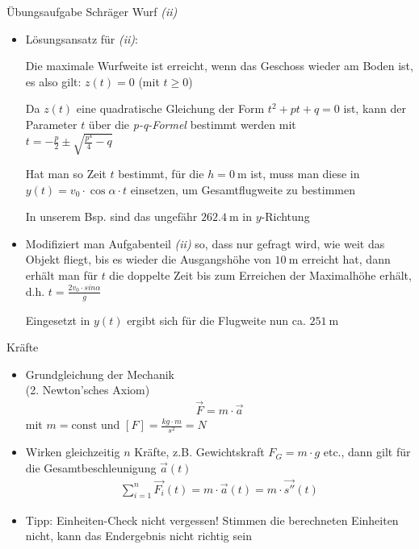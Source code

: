 \documentclass{beamer}
\begin{document}
\begin{frame}{Übungsaufgabe Schräger Wurf \emph{(ii)}}
    \begin{itemize}
    
    \item Lösungsansatz für \emph{(ii)}:
    
    Die maximale Wurfweite ist erreicht, wenn das Geschoss wieder am Boden ist, 
    es also gilt: $z (t) = 0$ (mit  $t \ge 0$)
    
    Da $z (t)$ eine quadratische Gleichung der Form $t^2 + p t + q = 0$ ist,
    kann der Parameter $t$ über die \emph{p-q-Formel} bestimmt werden mit \\
    $t = -\frac{p}{2} \pm \sqrt{\frac{p^4}{4} - q}$
    
    Hat man so Zeit $t$ bestimmt, für die $h = \SI{0}{\meter}$ ist, muss
    man diese in $y (t) = v_0 \cdot \cos \alpha \cdot t$ einsetzen, um  
    Gesamtflugweite zu bestimmen
    
    In unserem Bsp. sind das ungefähr $\SI{262.4}{\meter}$ in $y$-Richtung
    
    
    \item Modifiziert man Aufgabenteil \emph{(ii)} so, dass nur gefragt wird, wie weit das Objekt 
    fliegt, bis es wieder die Ausgangshöhe von $\SI{10}{\meter}$ erreicht hat, dann
    erhält man für $t$ die doppelte Zeit bis zum Erreichen der Maximalhöhe erhält, 
    d.h. $t = \frac{2 v_0 \cdot sin \alpha}{g}$
    
    Eingesetzt in $y (t)$ ergibt sich für die Flugweite nun ca. $\SI{251}{\meter}$
    
    \end{itemize}
    
\end{frame}

\begin{frame}{Kräfte}
    
  \begin {itemize}
    \item Grundgleichung der Mechanik \\
    (2. Newton'sches Axiom)
  \begin{align}
    \vec{F} = m \cdot \vec{a}
    \label{eq:fma}
  \end{align}
    mit $m = \text{const}$ und $[F] = \frac{kg \cdot m}{s^2} = N$
    
    \item Wirken gleichzeitig $n$ Kräfte, z.B. Gewichtskraft $F_G = m \cdot g$ etc.,
    dann gilt für die Gesamtbeschleunigung $\vec{a} (t)$
    \begin{align}
    \sum_{i=1}^{n} \vec{F_i} (t) = m \cdot \vec{a} (t) = m \cdot \vec{s''} (t)
    \end{align}
    
    \item Tipp: Einheiten-Check nicht vergessen! Stimmen die berechneten Einheiten
    nicht, kann das Endergebnis nicht richtig sein
    
    \end{itemize}
    
\end{frame}
\end{document}
